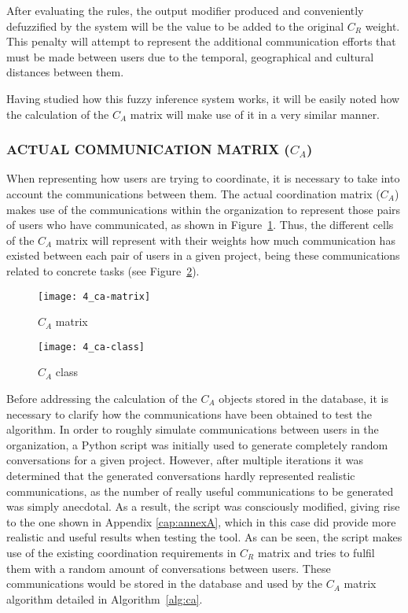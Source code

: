 After evaluating the rules, the output modifier produced and conveniently defuzzified by the system will be the value to be added to the original $C_R$ weight. This penalty will attempt to represent the additional communication efforts that must be made between users due to the temporal, geographical and cultural distances between them.

Having studied how this fuzzy inference system works, it will be easily noted how the calculation of the $C_A$ matrix will make use of it in a very similar manner.

\subsubsection{ACTUAL COMMUNICATION MATRIX ($C_A$)}

When representing how users are trying to coordinate, it is necessary to take into account the communications between them. The actual coordination matrix ($C_A$) makes use of the communications within the organization to represent those pairs of users who have communicated, as shown in Figure~\ref{fig:ca-matrix}. Thus, the different cells of the $C_A$ matrix will represent with their weights how much communication has existed between each pair of users in a given project, being these communications related to concrete tasks (see Figure~\ref{fig:ca-class}).

\begin{figure}
	\centering
	\texttt{[image: 4\_ca-matrix]}
	\caption[$C_A$ matrix]{$C_A$ matrix}
	\label{fig:ca-matrix}
\end{figure}

\begin{figure}
	\centering
	\texttt{[image: 4\_ca-class]}
	\caption[$C_A$ class]{$C_A$ class}
	\label{fig:ca-class}
\end{figure}

Before addressing the calculation of the $C_A$ objects stored in the database, it is necessary to clarify how the communications have been obtained to test the algorithm. In order to roughly simulate communications between users in the organization, a Python script was initially used to generate completely random conversations for a given project. However, after multiple iterations it was determined that the generated conversations hardly represented realistic communications, as the number of really useful communications to be generated was simply anecdotal. As a result, the script was consciously modified, giving rise to the one shown in Appendix \ref{cap:annexA}, which in this case did provide more realistic and useful results when testing the tool. As can be seen, the script makes use of the existing coordination requirements in $C_R$ matrix and tries to fulfil them with a random amount of conversations between users. These communications would be stored in the database and used by the $C_A$ matrix algorithm detailed in Algorithm~\ref{alg:ca}.

